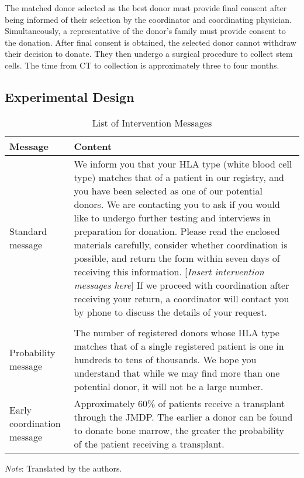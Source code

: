 \documentclass[12pt, a4paper]{article}
\begin{document}
The matched donor selected as the best donor must provide final consent after being informed of their selection by the coordinator and coordinating physician. Simultaneously, a representative of the donor's family must provide consent to the donation. After final consent is obtained, the selected donor cannot withdraw their decision to donate. They then undergo a surgical procedure to collect stem cells. The time from CT to collection is approximately three to four months.

\subsection{Experimental Design}\label{design}

\begin{table}
\centering
\caption{\label{tab:list-message}List of Intervention Messages}
\centering
\fontsize{8}{10}\selectfont
\begin{threeparttable}
\begin{tabular}[t]{l>{\raggedright\arraybackslash}p{40em}}
\toprule
Message & Content\\
\midrule
Standard message & We inform you that your HLA type (white blood cell type) matches that of a patient in our registry, and you have been selected as one of our potential donors. We are contacting you to ask if you would like to undergo further testing and interviews in preparation for donation. Please read the enclosed materials carefully, consider whether coordination is possible, and return the form within seven days of receiving this information. [\emph{Insert intervention messages here}] If we proceed with coordination after receiving your return, a coordinator will contact you by phone to discuss the details of your request.\\
\addlinespace[0.3em]
\multicolumn{2}{l}{\textbf{Intervention message}}\\
\hspace{1em}Probability message & The number of registered donors whose HLA type matches that of a single registered patient is one in hundreds to tens of thousands. We hope you understand that while we may find more than one potential donor, it will not be a large number.\\
\hspace{1em}Early coordination message & Approximately 60\% of patients receive a transplant through the JMDP. The earlier a donor can be found to donate bone marrow, the greater the probability of the patient receiving a transplant.\\
\bottomrule
\end{tabular}
\begin{tablenotes}
\item \emph{Note}: Translated by the authors.
\end{tablenotes}
\end{threeparttable}
\end{table}
\end{document}
